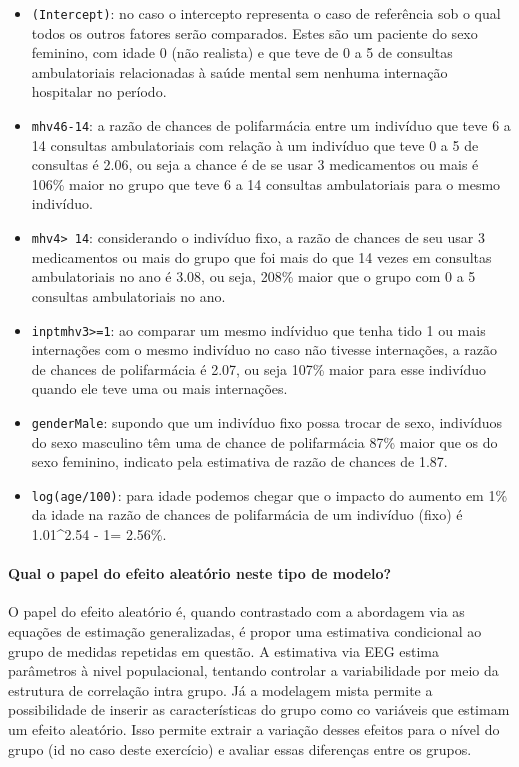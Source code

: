 \documentclass[
  11pt,
]{article}
\begin{document}
\begin{itemize}
\item
  \texttt{(Intercept)}: no caso o intercepto representa o caso de referência sob o qual todos os outros fatores serão comparados. Estes são um paciente do sexo feminino, com idade 0 (não realista) e que teve de 0 a 5 de consultas ambulatoriais relacionadas à saúde mental sem nenhuma internação hospitalar no período.
\item
  \texttt{mhv46-14}: a razão de chances de polifarmácia entre um indivíduo que teve 6 a 14 consultas ambulatoriais com relação à um indivíduo que teve 0 a 5 de consultas é 2.06, ou seja a chance é de se usar 3 medicamentos ou mais é 106\% maior no grupo que teve 6 a 14 consultas ambulatoriais para o mesmo indivíduo.
\item
  \texttt{mhv4\textgreater{}\ 14}: considerando o indivíduo fixo, a razão de chances de seu usar 3 medicamentos ou mais do grupo que foi mais do que 14 vezes em consultas ambulatoriais no ano é 3.08, ou seja, 208\% maior que o grupo com 0 a 5 consultas ambulatoriais no ano.
\item
  \texttt{inptmhv3\textgreater{}=1}: ao comparar um mesmo indíviduo que tenha tido 1 ou mais internações com o mesmo indivíduo no caso não tivesse internações, a razão de chances de polifarmácia é 2.07, ou seja 107\% maior para esse indivíduo quando ele teve uma ou mais internações.
\item
  \texttt{genderMale}: supondo que um indivíduo fixo possa trocar de sexo, indivíduos do sexo masculino têm uma de chance de polifarmácia 87\% maior que os do sexo feminino, indicato pela estimativa de razão de chances de 1.87.
\item
  \texttt{log(age/100)}: para idade podemos chegar que o impacto do aumento em 1\% da idade na razão de chances de polifarmácia de um indivíduo (fixo) é 1.01\^{}2.54 - 1=
  2.56\%.
\end{itemize}

\hypertarget{qual-o-papel-do-efeito-aleatuxf3rio-neste-tipo-de-modelo}{%
\paragraph{Qual o papel do efeito aleatório neste tipo de modelo?}\label{qual-o-papel-do-efeito-aleatuxf3rio-neste-tipo-de-modelo}}

O papel do efeito aleatório é, quando contrastado com a abordagem via as equações de estimação generalizadas, é propor uma estimativa condicional ao grupo de medidas repetidas em questão. A estimativa via EEG estima parâmetros à nivel populacional, tentando controlar a variabilidade por meio da estrutura de correlação intra grupo.
Já a modelagem mista permite a possibilidade de inserir as características do grupo como co variáveis que estimam um efeito aleatório. Isso permite extrair a variação desses efeitos para o nível do grupo (id no caso deste exercício) e avaliar essas diferenças entre os grupos.
\end{document}
